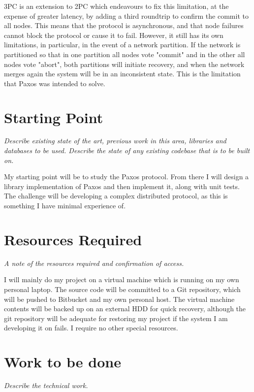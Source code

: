 3PC is an extension to 2PC which endeavours to fix this limitation, at the expense of greater
latency, by adding a third roundtrip to confirm the commit to all nodes. This means that the
protocol is asynchronous, and that node failures cannot block the protocol or cause it to fail.
However, it still has its own limitations, in particular, in the event of a network partition. If
the network is partitioned so that in one partition all nodes vote "commit" and in the other all
nodes vote "abort", both partitions will initiate recovery, and when the network merges again the
system will be in an inconsistent state. This is the limitation that Paxos was intended to solve.

\section*{Starting Point}

{\em Describe existing state of the art, previous work in this area, libraries and databases to be used.
Describe the state of any existing codebase that is to be built on.  }

My starting point will be to study the Paxos protocol. From there I will design a library
implementation of Paxos and then implement it, along with unit tests. The challenge will be
developing a complex distributed protocol, as this is something I have minimal experience of.

\section*{Resources Required}

{\em A note of the resources required and confirmation of access.}

I will mainly do my project on a virtual machine which is running on my own personal laptop.
The source code will be committed to a Git repository, which will be pushed to Bitbucket and my
own personal host. The virtual machine contents will be backed up on an external HDD for quick
recovery, although the git repository will be adequate for restoring my project if the system I am
developing it on fails.
I require no other special resources.

\section*{Work to be done}

{\em Describe the technical work.}

